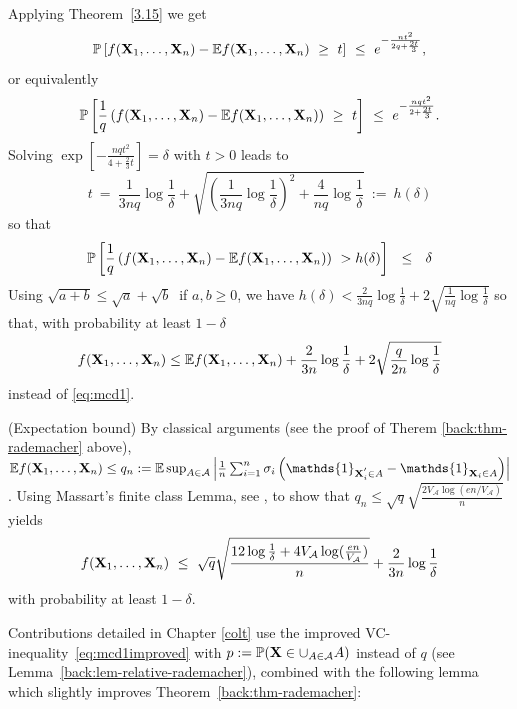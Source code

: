 Applying Theorem~\ref{3.15} we get
$$\mathbb{P}\left [ f(\mathbf X_1,\ldots,\mathbf X_n) - \mathbb{E} f(\mathbf X_1,\ldots,\mathbf X_n) ~\ge~ t \right] ~\le~ e^{-\frac{n t^2}{2q + \frac{2t}{3}} },$$
or equivalently
$$\mathbb{P}\left [ \frac{1}{q} \left(f(\mathbf X_1,\ldots,\mathbf X_n) - \mathbb{E} f(\mathbf X_1,\ldots,\mathbf X_n)\right) ~\ge~ t \right] ~\le~ e^{-\frac{n qt^2}{2 + \frac{2t}{3}} }.$$
Solving $ \exp \left [ - \frac{nq t^2}{4  + \frac{2}{3} t}\right]=\delta$ with $t > 0$ leads to $$t ~=~ \frac{1}{3nq} \log \frac{1}{\delta} + \sqrt{\left ( \frac{1}{3nq} \log \frac{1}{\delta}\right)^{2} + \frac{4}{nq} \log \frac{1}{\delta} } ~:=~h(\delta)$$ so that
\begin{align*}
\mathbb{P} \left [ \frac{1}{q} \left(f(\mathbf X_1,\ldots,\mathbf X_n) - \mathbb{E} f(\mathbf X_1,\ldots,\mathbf X_n)\right)  ~> h(\delta) \right] ~~\le~~ \delta
\end{align*}
\noindent
Using $\sqrt{a+b} \le \sqrt a + \sqrt b~$ if $a,b \ge 0$, we have $h(\delta) < \frac{2}{3nq} \log \frac{1}{\delta} + 2 \sqrt{\frac{1}{nq} \log \frac{1}{\delta}} $ so that, with probability at least $1-\delta$
\begin{align}
\label{eq:mcd1improved}
f(\mathbf X_1,\ldots,\mathbf X_n) \le \mathbb{E}f(\mathbf X_1,\ldots,\mathbf X_n) + \frac{2}{3n} \log{\frac{1}{\delta}} + 2\sqrt{\frac{q}{2n} \log{\frac{1}{\delta}}}
\end{align}
instead of \eqref{eq:mcd1}.
%
\begin{remark}({\sc Expectation bound})
By classical arguments (see the proof of Therem \ref{back:thm-rademacher} above), $\mathbb{E}f(\mb X_1,\ldots,\mb X_n) \le q_n := \mathbb{E} \sup_{A \in \mathcal{A}} \left |\frac{1}{n} \sum_{i=1}^{n} \sigma_i \left ( \mathds{1}_{\mb X_i^{'} \in A} - \mathds{1}_{\mb X_i \in A} \right) \right|$. Using Massart's finite class Lemma, see \cite{Massart2000}, to show that $q_n \le \sqrt{q} \sqrt{\frac{2 V_\mathcal{A} \log(en/V_\mathcal{A})}{n}}$ yields
\begin{align*}
f(\mathbf X_1,\ldots,\mathbf X_n) ~\le~ \sqrt{q} \sqrt{\frac{12 \log\frac{1}{\delta} + 4 V_\mathcal{A} \log(\frac{en}{V_\mathcal{A}})}{n}} + \frac{2}{3n} \log\frac{1}{\delta}
\end{align*}
with probability at least $1-\delta$.
\end{remark}
%
Contributions detailed in Chapter \ref{colt} use the improved VC-inequality~\eqref{eq:mcd1improved} with $p:= \mathbb{P}(\mathbf X \in \cup_{A \in \mathcal{A}}A)$ instead of $q$ (see Lemma~\ref{back:lem-relative-rademacher}), combined with the following lemma which slightly improves Theorem~\ref{back:thm-rademacher}:

